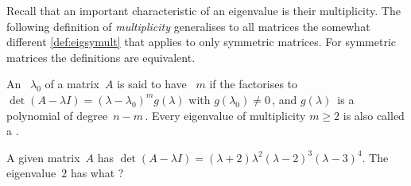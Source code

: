 Recall that an important characteristic of an eigenvalue is their multiplicity.
The following definition of \emph{multiplicity} generalises to all matrices the somewhat different \autoref{def:eigsymult} that applies to only symmetric matrices.
For symmetric matrices the definitions are equivalent.


\begin{definition} \label{def:eigmult}
An ~\(\lambda_0\) of a matrix~\(A\) is said to have ~\(m\) if the  factorises to \(\det(A-\lambda I)=(\lambda-\lambda_0)^mg(\lambda)\) with \(g(\lambda_0)\neq0\)\,, and \(g(\lambda)\)~is a polynomial of degree~\(n-m\)\,.
Every eigenvalue of multiplicity \(m\geq2\) is also called a .
\end{definition}



\begin{activity}
A given matrix~\(A\) has  \(\det(A-\lambda I)=(\lambda+2)\lambda^2(\lambda-2)^3(\lambda-3)^4\).
The eigenvalue~\(2\) has what ?
\end{activity}



